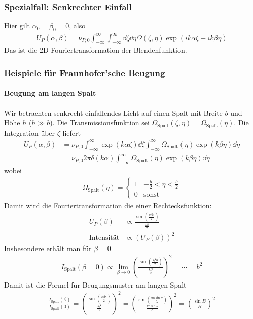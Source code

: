 \subsubsection[Senkrechter Einfall]%
{Spezialfall: Senkrechter Einfall}
Hier gilt $\alpha_0=\beta_0=0$, also
\begin{gather*}
  U_P(\alpha,\beta) 
  = \nu_{P,0} \int_{-\infty}^{\infty}\int_{-\infty}^{\infty}
  \dd\zeta\dd\eta \Omega(\zeta,\eta)
  \exp\left( ik\alpha\zeta - ik\beta\eta \right)
\end{gather*}
Das ist die 2D-Fouriertransformation der Blendenfunktion.

\subsubsection{Beispiele für Fraunhofer'sche Beugung}
\paragraph{Beugung am langen Spalt}
Wir betrachten senkrecht einfallendes Licht auf einen Spalt mit Breite
$b$ und Höhe $h$ ($h\gg b$). Die Transmissionsfunktion sei 
$\Omega_\text{Spalt}(\zeta,\eta) = \Omega_\text{Spalt}(\eta)$.
Die Integration über $\zeta$ liefert
\begin{align*}
  U_P(\alpha,\beta) 
  &= \nu_{P,0} 
    \int_{-\infty}^{\infty} \exp(k\alpha\zeta)\dd\zeta
    \int_{-\infty}^{\infty} \Omega_\text{Spalt}(\eta)\exp(k\beta\eta)\dd\eta\\
  &= \nu_{P,0} 2\pi\delta(k\alpha)
    \int_{-\infty}^{\infty} \Omega_\text{Spalt}(\eta)\exp(k\beta\eta)\dd\eta
\end{align*}
wobei
\begin{gather*}
  \Omega_\text{Spalt}(\eta) = 
  \begin{cases}
    1 & -\frac{b}{2} < \eta < \frac{b}{2}\\
    0 & \text{sonst}
  \end{cases}
\end{gather*}
Damit wird die Fouriertransformation die einer Rechtecksfunktion:
\begin{align*}
  U_P(\beta) 
  &\propto \frac{\sin(\frac{k\beta b}{2})}{\frac{k\beta}{2}}\\
  \text{Intensität}
  &\propto (U_P(\beta))^2
\end{align*}
Insbesondere erhält man für $\beta=0$ 
\begin{gather*}
  I_\text{Spalt}(\beta=0) 
  \propto \lim_{\beta\to0} \left(
    \frac{\sin(\frac{k\beta b}{2})}{\frac{k\beta}{2}}
  \right)^2
  = \dotsb = b^2
\end{gather*}
Damit ist die Formel für Beugungsmuster am langen Spalt
\begin{gather*}
  \frac{I_\text{Spalt}(\beta)}{I_\text{Spalt}(0)}
  = \left(
    \frac{\sin(\frac{k\beta b}{2})}{\frac{k\beta}{2}}
  \right)^2
  = \left(
    \frac{\sin(\frac{\pi b\sin\theta}{\lambda})}
    {\frac{\pi b\sin\theta}{\lambda}}
  \right)^2
  = \left(\frac{\sin B}{B}\right)^2
\end{gather*}

